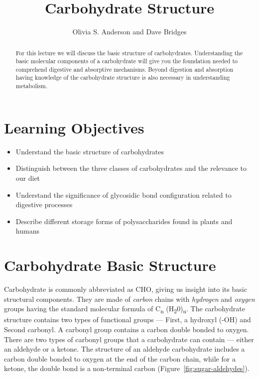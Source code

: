\documentclass{tufte-handout}
\title{Carbohydrate Structure}
\author{Olivia S. Anderson and Dave Bridges}
\date{}  %
\begin{document}
\maketitle%

\begin{abstract}
For this lecture we will discuss the basic structure of carbohydrates. Understanding the basic molecular components of a carbohydrate will give you the foundation needed to comprehend digestive and absorptive mechanisms. Beyond digestion and absorption having knowledge of the carbohydrate structure is also necessary in understanding metabolism. 
\end{abstract}

\tableofcontents


\pagebreak

\section{Learning Objectives}

\begin{itemize}
\item Understand the basic structure of carbohydrates
\item Distinguish between the three classes of carbohydrates and the relevance to our diet
\item Understand the significance of glycosidic bond configuration related to digestive processes
\item Describe different storage forms of polysaccharides found in plants and humans
\end{itemize}

\section{Carbohydrate Basic Structure}\label{carbohydrate-basic-structure}
Carbohydrate is commonly abbreviated as CHO, giving us insight into its basic structural components. They are made of \emph{carbon} chains with \emph{hydrogen} and \emph{oxygen} groups having the standard molecular formula of C\textsubscript{n} (H\textsubscript{2}0)\textsubscript{n}. The carbohydrate structure contains two types of functional groups --- First, a hydroxyl (-OH) and Second carbonyl. A carbonyl group contains a carbon double bonded to oxygen. There are two types of carbonyl groups that a carbohydrate can contain --- either an aldehyde or a ketone. The structure of an aldehyde carbohydrate includes a carbon double bonded to oxygen at the end of the carbon chain, while for a ketone, the double bond is a non-terminal carbon (Figure~\ref{fig:sugar-aldehydes}).
\end{document}
